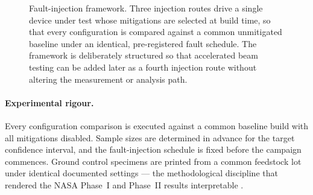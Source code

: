 \documentclass[11pt,a4paper]{article}
\begin{document}
\begin{figure}[htbp]
{}
\caption{Fault-injection framework. Three injection routes drive a single device
under test whose mitigations are selected at build time, so that every
configuration is compared against a common unmitigated baseline under an
identical, pre-registered fault schedule. The framework is deliberately
structured so that accelerated beam testing can be added later as a fourth
injection route without altering the measurement or analysis path.}
\label{fig:injection}
\end{figure}

\paragraph{Experimental rigour.}
Every configuration comparison is executed against a common baseline build with
all mitigations disabled. Sample sizes are determined in advance for the target
confidence interval, and the fault-injection schedule is fixed before the
campaign commences. Ground control specimens are printed from a common feedstock
lot under identical documented settings --- the methodological discipline that
rendered the NASA Phase~I and Phase~II results interpretable
\cite{prater2019zerog}.
\end{document}
